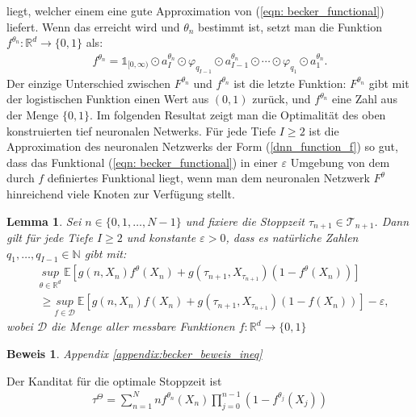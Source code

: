 \documentclass[12pt,titlepage,headsepline]{article}
\newtheorem{lemma}[theorem]{Lemma}
\newtheorem*{beweis-non}{Beweis}
\begin{document}
      liegt, welcher einem eine gute Approximation von (\ref{eqn: becker_functional}) liefert. Wenn das erreicht wird und $\theta_n$ bestimmt ist, setzt man die Funktion $f^{\theta_n}: \mathbb{R}^d \rightarrow \{0,1\}$ als:
      \begin{align}\label{dnn_function_f}
        f^{\theta_n} = \mathds{1}_{[0,\infty)}\odot a_I^{\theta_n} \odot \varphi_{q_{I-1}} \odot a_{I-1}^{\theta_n} \odot \cdots \odot \varphi_{q_{1}} \odot a_{1}^{\theta_n}.
      \end{align}
      Der einzige Unterschied zwischen $F^{\theta_n}$ und $f^{\theta_n}$ ist die letzte Funktion: $F^{\theta_n}$ gibt mit der logistischen Funktion einen Wert aus $(0,1)$ zurück, und $f^{\theta_n}$ eine Zahl aus der Menge $\{0,1\}$.
      \hfill\break
      Im folgenden Resultat zeigt man die Optimalität des oben konstruierten tief neuronalen Netwerks. Für jede Tiefe $I \geq 2$ ist die Approximation des neuronalen Netzwerks der Form (\ref{dnn_function_f}) so gut, dass das Funktional (\ref{eqn: becker_functional}) in einer $\varepsilon$ Umgebung von dem durch $f$ definiertes Funktional liegt, wenn man dem neuronalen Netzwerk $F^{\theta}$ hinreichend viele Knoten zur Verfügung stellt.
      \begin{lemma}\label{becker: beweis_ineq}
        \textup{
        Sei $n \in \{ 0,1,\ldots,N-1 \}$ und fixiere die Stoppzeit $\tau_{n+1} \in \mathcal{T}_{n+1}$. Dann gilt für jede Tiefe $I \geq 2$ und konstante $\varepsilon > 0$, dass es natürliche Zahlen $q_1,\ldots,q_{I-1} \in \mathbb{N}$ gibt mit:
        \begin{align*}
          & \underset{\theta \in \mathbb{R}^d}{sup} \ \mathbb{E}[g(n,X_n)f^{\theta}(X_n)+g(\tau_{n+1},X_{\tau_{n+1}})(1-f^{\theta}(X_n))] \\
          & \geq \underset{f \in \mathcal{D}}{sup} \ \mathbb{E}[g(n,X_n)f(X_n)+g(\tau_{n+1},X_{\tau_{n+1}})(1-f(X_n))] - \varepsilon,
        \end{align*}
        wobei $\mathcal{D}$ die Menge aller messbare Funktionen $f: \mathbb{R}^d \rightarrow \{0,1\}$
        }
      \end{lemma}
      \begin{beweis-non}
        Appendix \ref{appendix:becker_beweis_ineq}
      \end{beweis-non}
      \hfill\break
      Der Kanditat für die optimale Stoppzeit ist
      \begin{align}\label{eqn: becker_optimal_stopping_time}
        \tau^{\Theta} = \sum_{n=1}^{N}n f^{\theta_n}(X_n)\prod_{j=0}^{n-1}(1-f^{\theta_j}(X_j))
      \end{align}
\end{document}
